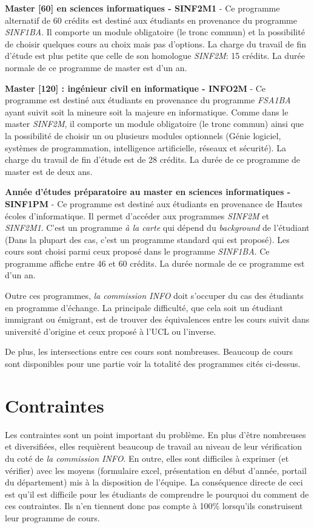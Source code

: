 \textbf{Master [60] en sciences informatiques - SINF2M1} \cite{SINF2M1} - Ce programme alternatif de 60 crédits est destiné aux étudiants en provenance du programme \textit{SINF1BA}. Il comporte un module obligatoire (le tronc commun) et la possibilité de choisir quelques cours au choix mais pas d'options. La charge du travail de fin d'étude est plus petite que celle de son homologue  \textit{SINF2M}: 15 crédits. La durée normale de ce programme de master est d'un an. 

\textbf{Master [120] : ingénieur civil en informatique - INFO2M} \cite{INFO2M} - Ce programme est destiné aux étudiants en provenance du programme \textit{FSA1BA} ayant suivit soit la mineure soit la majeure en informatique. Comme dans le master \textit{SINF2M}, il comporte un module obligatoire (le tronc commun) ainsi que la possibilité de choisir un ou plusieurs modules optionnels (Génie logiciel, systèmes de programmation, intelligence artificielle, réseaux et sécurité). La charge du travail de fin d'étude est de 28 crédits. La durée de ce programme de master est de deux ans.  

\textbf{Année d'études préparatoire au master en sciences informatiques - SINF1PM} \cite{SINF1PM} - Ce programme est destiné aux étudiants en provenance de Hautes écoles d'informatique. Il permet d'accéder aux programmes \textit{SINF2M} et \textit{SINF2M1}. C'est un programme \textit{à la carte} qui dépend du \textit{background} de l'étudiant (Dans la plupart des cas, c'est un programme standard qui est proposé). Les cours sont choisi parmi ceux proposé dans le programme \textit{SINF1BA}. Ce programme affiche entre 46 et 60 crédits. La durée normale de ce programme est d'un an.  
 

Outre ces programmes, \textit{la commission INFO} doit s'occuper du cas des étudiants en programme d'échange. La principale difficulté, que cela soit un étudiant immigrant ou émigrant, est de trouver des équivalences entre les cours suivit dans université d'origine et ceux proposé à l'UCL ou l'inverse. 

De plus, les intersections entre ces cours sont nombreuses. Beaucoup de cours sont disponibles pour une partie voir la totalité des programmes cités ci-dessus.  
\clearpage
\section{Contraintes}

Les contraintes sont un point important du problème. En plus d'être nombreuses et diversifiées, elles requièrent beaucoup de travail au niveau de leur vérification du coté de \textit{la commission INFO}. En outre, elles sont difficiles à exprimer (et vérifier) avec les moyens (formulaire excel, présentation en début d'année, portail du département) mis à la disposition de l'équipe. La conséquence directe de ceci est qu'il est difficile pour les étudiants de comprendre le pourquoi du comment de ces contraintes. Ils n'en tiennent donc pas compte à 100\% lorsqu'ils construisent leur programme de cours.

